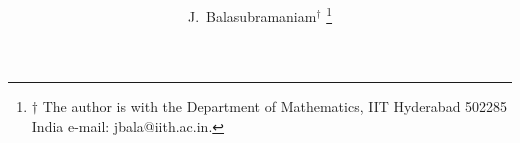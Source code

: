 \documentclass[journal,12pt,twocolumn]{IEEEtran}
\begin{document}
\providecommand{\nCr}[2]{\,^{#1}C_{#2}} %
\providecommand{\nPr}[2]{\,^{#1}P_{#2}} %
\providecommand{\mbf}{\mathbf}
\providecommand{\pr}[1]{\ensuremath{\Pr\left(#1\right)}}
\providecommand{\qfunc}[1]{\ensuremath{Q\left(#1\right)}}
\providecommand{\sbrak}[1]{\ensuremath{{}\left[#1\right]}}
\providecommand{\lsbrak}[1]{\ensuremath{{}\left[#1\right.}}
\providecommand{\rsbrak}[1]{\ensuremath{{}\left.#1\right]}}
\providecommand{\brak}[1]{\ensuremath{\left(#1\right)}}
\providecommand{\lbrak}[1]{\ensuremath{\left(#1\right.}}
\providecommand{\rbrak}[1]{\ensuremath{\left.#1\right)}}
\providecommand{\cbrak}[1]{\ensuremath{\left\{#1\right\}}}
\providecommand{\lcbrak}[1]{\ensuremath{\left\{#1\right.}}
\providecommand{\rcbrak}[1]{\ensuremath{\left.#1\right\}}}
\newcommand{\sgn}{\mathop{\mathrm{sgn}}}
\providecommand{\abs}[1]{\left\vert#1\right\vert}
\providecommand{\res}[1]{\Res\displaylimits_{#1}} 
\providecommand{\norm}[1]{\lVert#1\rVert}
\providecommand{\mtx}[1]{\mathbf{#1}}
\providecommand{\mean}[1]{E\left[ #1 \right]}
\providecommand{\fourier}{\overset{\mathcal{F}}{ \rightleftharpoons}}
\providecommand{\system}{\overset{\mathcal{H}}{ \longleftrightarrow}}

\newcommand{\solution}{\noindent \textbf{Solution: }}
\providecommand{\dec}[2]{\ensuremath{\overset{#1}{\underset{#2}{\gtrless}}}}
\title{ 
}
\author{J.~Balasubramaniam$^{\dagger}$ %
\thanks{$\dagger$ The author is with the Department of Mathematics, IIT Hyderabad
502285 India e-mail: jbala@iith.ac.in. }
}
\maketitle
\end{document}

